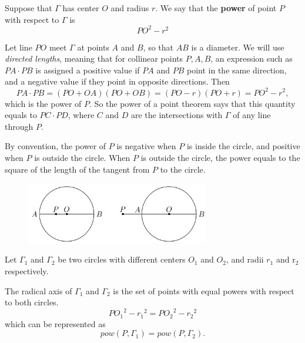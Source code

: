 Suppose that $\Gamma$ has center $O$ and radius $r$. We say that the \textbf{power} of point $P$ with respect to $\Gamma$ is
\[ PO^2 - r^2 \]

Let line $PO$ meet $\Gamma$ at points $A$ and $B$, so that $AB$ is a diameter. We will use \emph{directed lengths}, meaning that for collinear points $P, A, B$, an expression such as $PA \cdot PB$ is assigned a positive value if $PA$ and $PB$ point in the same direction, and a negative value if they point in opposite directions. Then
\[ PA \cdot P B = (PO + OA)(PO + OB) = (PO-r)(PO+r) = PO^2 - r^2, \]
which is the power of $P$. So the power of a point theorem says that this quantity equals to $PC \cdot PD$, where $C$ and $D$ are the intersections with $\Gamma$ of any line through $P$.

By convention, the power of $P$ is negative when $P$ is inside the circle, and positive when $P$
is outside the circle. When $P$ is outside the circle, the power equals to the square of the length
of the tangent from $P$ to the circle.

\begin{figure}[H]
    \centering
    \includegraphics[width=8cm]{images/Power_of_a_point3.jpg}
\end{figure}

Let $\Gamma_1$ and $\Gamma_2$ be two circles with different centers $O_1$ and $O_2$, and radii $r_1$ and r$_2$ respectively.

The radical axis of $\Gamma_1$ and $\Gamma_2$ is the set of points with equal powers with respect to both circles.
\[ {PO_1}^2 - {r_1}^2 = {PO_2}^2 - {r_2}^2 \]
which can be represented as 
\[ pow(P, \Gamma_1) = pow(P, \Gamma_2). \]

